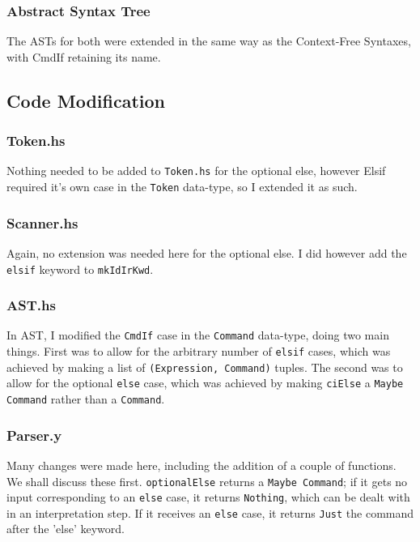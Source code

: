 \documentclass[12pt]{article}
\newcommand{\lstin}[3]{
  
}
\begin{document}
\subsubsection{Abstract Syntax Tree}
The ASTs for both were extended in the same way as the Context-Free Syntaxes, with CmdIf retaining its name.

\subsection{Code Modification}
\subsubsection{Token.hs}
Nothing needed to be added to \verb|Token.hs| for the optional else, however Elsif required it's own case in the \verb|Token| data-type, so I extended it as such.

\lstin{49}{49}{Token.hs}

\subsubsection{Scanner.hs}
Again, no extension was needed here for the optional else. 
I did however add the \verb|elsif| keyword to \verb|mkIdIrKwd|.

\lstin{157}{157}{Scanner.hs}

\subsubsection{AST.hs}
In AST, I modified the \verb|CmdIf| case in the \verb|Command| data-type, doing two main things. 
First was to allow for the arbitrary number of \verb|elsif| cases, which was achieved by making a list of \verb|(Expression, Command)| tuples. 
The second was to allow for the optional \verb|else| case, which was achieved by making \verb|ciElse| a \verb|Maybe Command| rather than a \verb|Command|.

\lstin{101}{105}{AST.hs}

\subsubsection{Parser.y}
Many changes were made here, including the addition of a couple of functions. 
We shall discuss these first. 
\verb|optionalElse| returns a \verb|Maybe Command|; if it gets no input corresponding to an \verb|else| case, it returns \verb|Nothing|, which can be dealt with in an interpretation step. 
If it receives an \verb|else| case, it returns \verb|Just| the command after the 'else' keyword.
\end{document}
